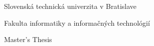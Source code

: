 \begin{center}
\thispagestyle{empty}
{\Large Slovenská technická univerzita v Bratislave}
\par\end{center}{\Large \par}

\begin{center}
{\Large Fakulta informatiky a informačných technológií}
\par\end{center}{\Large \par}

\smallskip{}

\begin{center}
\myEvidenceNumber
\par\end{center}
\vfill{}

\begin{center}
\textbf{\Large \myName}
\par\end{center}{\Large \par}

\medskip{}


\begin{center}
\textbf{\LARGE \myTitle }
\par\end{center}{\huge \par}

\medskip{}


\begin{center}

{\Large Master's Thesis}
\par\end{center}{\Large \par}

\vfill{}